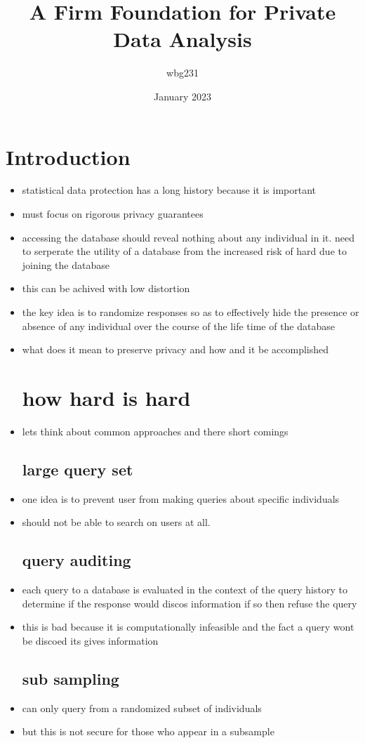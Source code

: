 \documentclass{article}
\title{A Firm
Foundation
for Private
Data Analysis }
\author{wbg231 }
\date{January 2023}
\begin{document}
\maketitle

\section{Introduction}
\begin{itemize}
\item statistical data protection has a long history because it is important
\item must focus on rigorous privacy guarantees
\item accessing the database should reveal nothing about any individual in it. need to serperate the utility of a database from the increased risk of hard due to joining the database 
\item this can be achived with low distortion
\item the key idea is to randomize responses so as to effectively hide the presence or absence of any individual over the course of the life time of the database 
\item what does it mean to preserve privacy and how and it be accomplished 
\section*{how hard is hard}
\item lets think about common approaches and there short comings
\subsection*{large query set}
\item one idea is to prevent user from making queries about specific individuals
\item should not be able to search on users at all. 
\subsection*{query auditing}
\item each query to a database is evaluated in the context of the query history to determine if the response would discos information if so then refuse the query
\item this is bad because it is computationally infeasible and the fact a query wont be discoed its gives information 
\subsection*{sub sampling }
\item can only query from a randomized subset of individuals 
\item but this is not secure for those who appear in a subsample 

\end{itemize}
\end{document}
